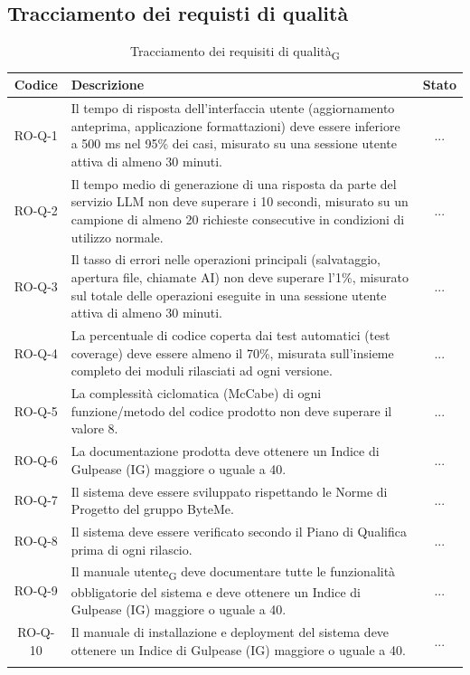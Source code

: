 \documentclass[11pt,a4paper]{article}
\newcommand{\gls}[1]{#1\textsubscript{G}}
\begin{document}
\subsection{Tracciamento dei requisti di qualità}
\begin{longtable}{|c|p{11cm}|c|}
\hline
\textbf{Codice} & \textbf{Descrizione} & \textbf{Stato}\\
\hline
\endhead
RO-Q-1 & Il tempo di risposta dell'interfaccia utente (aggiornamento anteprima, applicazione formattazioni) deve essere inferiore a 500 ms nel 95\% dei casi, misurato su una sessione utente attiva di almeno 30 minuti.  & ... \\
\hline
RO-Q-2 & Il tempo medio di generazione di una risposta da parte del servizio LLM non deve superare i 10 secondi, misurato su un campione di almeno 20 richieste consecutive in condizioni di utilizzo normale.  & ... \\
\hline
RO-Q-3 & Il tasso di errori nelle operazioni principali (salvataggio, apertura file, chiamate AI) non deve superare l'1\%, misurato sul totale delle operazioni eseguite in una sessione utente attiva di almeno 30 minuti. & ... \\
\hline
RO-Q-4 & La percentuale di codice coperta dai test automatici (test coverage) deve essere almeno il 70\%, misurata sull'insieme completo dei moduli rilasciati ad ogni versione. & ... \\
\hline
RO-Q-5 & La complessità ciclomatica (McCabe) di ogni funzione/metodo del codice prodotto non deve superare il valore 8. & ... \\
\hline
RO-Q-6 & La documentazione prodotta deve ottenere un Indice di Gulpease (IG) maggiore o uguale a 40. & ... \\
\hline
RO-Q-7 & Il sistema deve essere sviluppato rispettando le Norme 
di Progetto del gruppo ByteMe. & ... \\
\hline
RO-Q-8 & Il sistema deve essere verificato secondo il Piano di Qualifica prima di ogni rilascio. & ... \\
\hline
RO-Q-9 & Il \gls{manuale utente} deve documentare tutte le funzionalità obbligatorie del sistema e deve ottenere un Indice di Gulpease (IG) maggiore o uguale a 40. & ... \\
\hline
RO-Q-10 & Il manuale di installazione e deployment del sistema deve ottenere un Indice di Gulpease (IG) maggiore o uguale a 40. & ... \\
\hline
\addlinespace[1em]
\caption{Tracciamento dei \gls{requisiti di qualità}}
\label{tab:tracciamento_requisiti_qualità}
\end{longtable}
\end{document}
